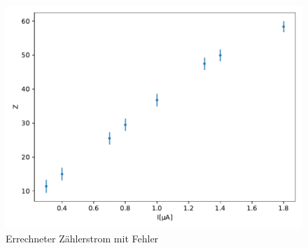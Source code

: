     \begin{figure}
	    \centering
	    \includegraphics[width=0.8\linewidth]{Daten/d.pdf}
	    \caption{Errechneter Zählerstrom mit Fehler}
    \end{figure}
